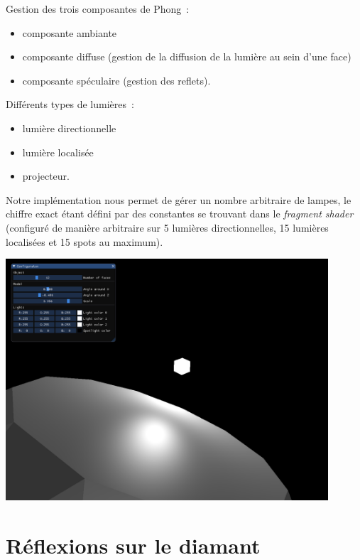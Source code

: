 \documentclass[11pt]{beamer}
\begin{document}
\begin{frame}
    Gestion des trois composantes de Phong~:
    \begin{itemize}
        \item composante ambiante
        \item composante diffuse (gestion de la diffusion de la lumière au sein d'une face)
        \item composante spéculaire (gestion des reflets).
    \end{itemize}

    Différents types de lumières~:
    \begin{itemize}
        \item lumière directionnelle
        \item lumière localisée
        \item projecteur.
    \end{itemize}

    Notre implémentation nous permet de gérer un nombre arbitraire de lampes, le chiffre exact étant défini par des constantes
    se trouvant dans le \textit{fragment shader} (configuré de manière arbitraire sur 5 lumières directionnelles, 15 lumières localisées et 15 spots au maximum).
\end{frame}

\begin{frame}
    {\centering \includegraphics[width=0.9\textwidth]{screenshot_software_3}}
\end{frame}

\section{Réflexions sur le diamant}
\end{document}
